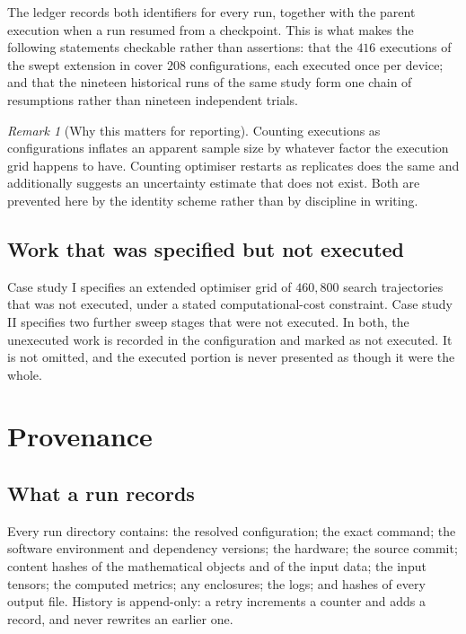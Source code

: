\documentclass[11pt]{amsart}
\theoremstyle{remark}
\newtheorem{remark}{Remark}[section]
\begin{document}
The ledger records both identifiers for every run, together with the parent execution when
a run resumed from a checkpoint. This is what makes the following statements checkable
rather than assertions: that the $416$ executions of the swept extension in
\cite{ChaveroJassoNumerical} cover $208$ configurations, each executed once per device; and
that the nineteen historical runs of the same study form one chain of resumptions rather
than nineteen independent trials.

\begin{remark}[Why this matters for reporting]
\label{rem:accounting}
Counting executions as configurations inflates an apparent sample size by whatever factor
the execution grid happens to have. Counting optimiser restarts as replicates does the same
and additionally suggests an uncertainty estimate that does not exist. Both are prevented
here by the identity scheme rather than by discipline in writing.
\end{remark}

\subsection{Work that was specified but not executed}

Case study I specifies an extended optimiser grid of $460{,}800$ search trajectories that
was not executed, under a stated computational-cost constraint. Case study II specifies two
further sweep stages that were not executed. In both, the unexecuted work is recorded in
the configuration and marked as not executed. It is not omitted, and the executed portion is
never presented as though it were the whole.

\section{Provenance}
\label{sec:provenance}

\subsection{What a run records}

Every run directory contains: the resolved configuration; the exact command; the software
environment and dependency versions; the hardware; the source commit; content hashes of the
mathematical objects and of the input data; the input tensors; the computed metrics; any
enclosures; the logs; and hashes of every output file. History is append-only: a retry
increments a counter and adds a record, and never rewrites an earlier one.
\end{document}
